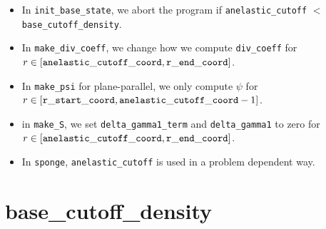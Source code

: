 \begin{itemize}

\item In {\tt init\_base\_state}, we abort the program if 
  {\tt anelastic\_cutoff} $<$ {\tt base\_cutoff\_density}.

\item In {\tt make\_div\_coeff}, we change how we compute {\tt div\_coeff} 
  for $r\in[{\tt anelastic\_cutoff\_coord},{\tt r\_end\_coord}]$.

\item In {\tt make\_psi} for plane-parallel, we only compute $\psi$ for 
  $r\in[{\tt r\_start\_coord},{\tt anelastic\_cutoff\_coord}-1]$.

\item in {\tt make\_S}, we set {\tt delta\_gamma1\_term} and {\tt delta\_gamma1} 
  to zero for $r\in[{\tt anelastic\_cutoff\_coord},{\tt r\_end\_coord}]$.

\item In {\tt sponge}, {\tt anelastic\_cutoff} is used in a problem
  dependent way.

\end{itemize}

\section{base\_cutoff\_density}\label{Sec:Base Cutoff Density}

